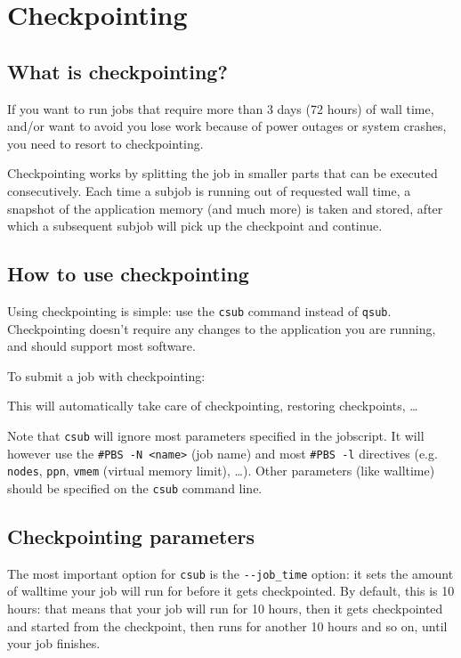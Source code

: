 \chapter{Checkpointing}
\label{ch:checkpointing}

\section{What is checkpointing?}

If you want to run jobs that require more than 3 days (72 hours) of wall time,
and/or want to avoid you lose work because of power outages or system crashes,
you need to resort to checkpointing.

Checkpointing works by splitting the job in smaller parts that can be executed
consecutively. Each time a subjob is running out of requested wall time,
a snapshot of the application memory (and much more) is taken and stored,
after which a subsequent subjob will pick up the checkpoint and continue.

\section{How to use checkpointing}

Using checkpointing is simple: use the \lstinline|csub| command instead of \lstinline|qsub|.
Checkpointing doesn't require any changes to the application you are running,
and should support most software.

To submit a job with checkpointing:

\begin{prompt}
\end{prompt}

This will automatically take care of checkpointing, restoring checkpoints, \ldots

Note that \lstinline|csub| will ignore most parameters specified in the jobscript.
It will however use the \lstinline|#PBS -N <name>| (job name) and most \lstinline|#PBS -l|
directives (e.g. \lstinline|nodes|, \lstinline|ppn|, \lstinline|vmem| (virtual memory limit),
\ldots). Other parameters (like walltime) should be specified on the \lstinline|csub|
command line.

\section{Checkpointing parameters}

The most important option for \lstinline|csub| is the \lstinline|--job_time| option: it sets the amount
of walltime your job will run for before it gets checkpointed. By default, this
is 10 hours: that means that your job will run for 10 hours, then it gets checkpointed
and started from the checkpoint, then runs for another 10 hours and so on, until
your job finishes.

